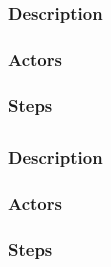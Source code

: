 \documentclass[12pt]{scrartcl}
\begin{document}
\subsubsection{Description}
\subsubsection{Actors}
\subsubsection{Steps}

\subsection{}
\subsubsection{Description}
\subsubsection{Actors}
\subsubsection{Steps}
\end{document}
